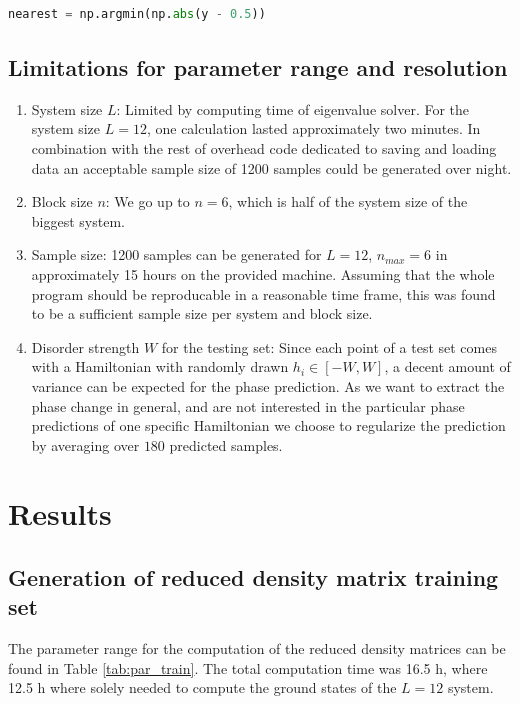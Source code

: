 \documentclass[reprint,amsmath,amssymb,aps,prb]{revtex4-2}
\begin{document}
\begin{lstlisting}[language=Python]
nearest = np.argmin(np.abs(y - 0.5))
\end{lstlisting}


\subsection{Limitations for parameter range and resolution}\label{sec:param}

\begin{enumerate}
	\item System size $L$: Limited by computing time of eigenvalue solver. For the system size $L=12$, one calculation lasted approximately two minutes. In combination with the rest of overhead code dedicated to saving and loading data an acceptable sample size of 1200 samples could be generated over night.
	\item Block size $n$: We go up to $n=6$, which is half of the system size of the biggest system.
	\item Sample size: 1200 samples can be generated for $L=12$, $n_{max}=6$ in approximately 15 hours on the provided machine. Assuming that the whole program should be reproducable in a reasonable time frame, this was found to be a sufficient sample size per system and block size.
	\item Disorder strength $W$ for the testing set: Since each point of a test set comes with a Hamiltonian with randomly drawn $h_i\in\left[-W,W\right]$, a decent amount of variance can be expected for the phase prediction. As we want to extract the phase change in general, and are not interested in the particular phase predictions of one specific Hamiltonian we choose to regularize the prediction by averaging over $180$ predicted samples.
\end{enumerate}

\section{Results}

\subsection{Generation of reduced density matrix training set}

The parameter range for the computation of the reduced density matrices can be found in Table \ref{tab:par_train}. The total computation time was 16.5 h, where 12.5 h where solely needed to compute the ground states of the $L=12$ system.
\end{document}
